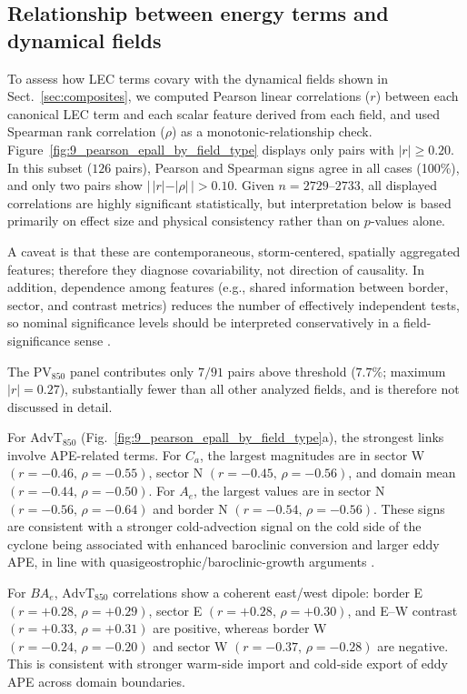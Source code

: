 \subsection{Relationship between energy terms and dynamical fields}\label{sec:correlation}

To assess how LEC terms covary with the dynamical fields shown in Sect.~\ref{sec:composites}, we computed Pearson linear correlations ($r$) between each canonical LEC term and each scalar feature derived from each field, and used Spearman rank correlation ($\rho$) as a monotonic-relationship check. Figure~\ref{fig:9_pearson_epall_by_field_type} displays only pairs with $|r| \geq 0.20$. In this subset ($126$ pairs), Pearson and Spearman signs agree in all cases (100\%), and only two pairs show $|\,|r|-|\rho|\,|>0.10$. Given $n=2729$--$2733$, all displayed correlations are highly significant statistically, but interpretation below is based primarily on effect size and physical consistency rather than on $p$-values alone.

A caveat is that these are contemporaneous, storm-centered, spatially aggregated features; therefore they diagnose covariability, not direction of causality. In addition, dependence among features (e.g., shared information between border, sector, and contrast metrics) reduces the number of effectively independent tests, so nominal significance levels should be interpreted conservatively in a field-significance sense \citep{livezey1983statistical,bretherton1999effective,wilks2016stippling}.

The $\mathrm{PV}_{850}$ panel contributes only $7/91$ pairs above threshold ($7.7\%$; maximum $|r|=0.27$), substantially fewer than all other analyzed fields, and is therefore not discussed in detail.

For $\mathrm{AdvT}_{850}$ (Fig.~\ref{fig:9_pearson_epall_by_field_type}a), the strongest links involve APE-related terms. For $C_a$, the largest magnitudes are in sector W $(r=-0.46,\,\rho=-0.55)$, sector N $(r=-0.45,\,\rho=-0.56)$, and domain mean $(r=-0.44,\,\rho=-0.50)$. For $A_e$, the largest values are in sector N $(r=-0.56,\,\rho=-0.64)$ and border N $(r=-0.54,\,\rho=-0.56)$. These signs are consistent with a stronger cold-advection signal on the cold side of the cyclone being associated with enhanced baroclinic conversion and larger eddy APE, in line with quasigeostrophic/baroclinic-growth arguments \citep{lorenz1955available,davies2015qgomega}.

For $BA_e$, $\mathrm{AdvT}_{850}$ correlations show a coherent east/west dipole: border E $(r=+0.28,\,\rho=+0.29)$, sector E $(r=+0.28,\,\rho=+0.30)$, and E--W contrast $(r=+0.33,\,\rho=+0.31)$ are positive, whereas border W $(r=-0.24,\,\rho=-0.20)$ and sector W $(r=-0.37,\,\rho=-0.28)$ are negative. This is consistent with stronger warm-side import and cold-side export of eddy APE across domain boundaries.


